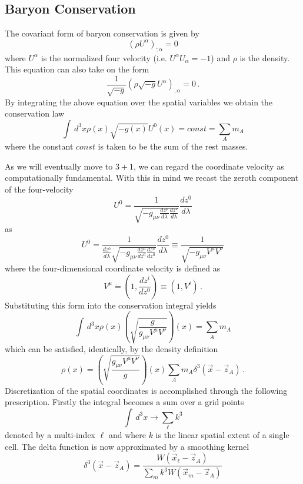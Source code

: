 \subsection{Baryon Conservation}

The covariant form of baryon conservation is given by 
\[
  \left( \rho U^{\alpha} \right)_{;\alpha} = 0
\]
where $U^{\alpha}$ is the normalized four velocity 
(i.e. $U^{\alpha} U_{\alpha} = -1$) and $\rho$ is the 
density.
This equation can also take on the form
\[
  \frac{1}{\sqrt{-g}} \left( \rho \sqrt{-g} U^{\alpha} \right)_{,\alpha} = 0 \, .
\]
By integrating the above equation over the spatial variables we
obtain the conservation law
\[
  \int \, d^3 x \rho(x) \sqrt{-g(x)} {U^{0}}(x) = const = \sum _A m_A
\]
where the constant $const$ is taken to be the sum of the rest masses.

As we will eventually move to $3+1$, we can regard  
the coordinate velocity as computationally fundamental.  
With this in mind we recast the zeroth component of the four-velocity
\[
  U^0 = \frac{1}{\sqrt{ -g_{\mu \nu} 
                        \frac{d z^{\mu}}{d \lambda}
                        \frac{d z^{\nu}}{d \lambda}				  
    	              } }
		\frac{d z^0}{d \lambda}
\]
as
\[
  U^0 = \frac{1}{ \frac{d z^0}{d \lambda} \sqrt{ -g_{\mu \nu} 
                        \frac{d z^{\mu}}{d z^0}
                        \frac{d z^{\nu}}{d z^0}				  
    	              } }
		\frac{d z^0}{d \lambda} 
	  \equiv \frac{1}{ \sqrt{ -g_{\mu \nu} V^{\mu} V^{\nu} } } 
\]
where the four-dimensional coordinate velocity is defined as
\[
  V^{\mu} {\dot = } \left(1, \frac{d z^i}{d z^0} \right) \equiv \left(1, V^i \right) \, .  
\]
Substituting this form into the conservation integral yields
\[
  \int \, d^3 x \rho(x)
                \left( 
                \sqrt{
                      \frac{ g } {g_{\mu \nu} V^{\mu} V^{\nu}}  
                     }
				\right)(x)  = \sum _A m_A
\]
which can be satisfied, identically, by the density definition
\[
  \rho(x) = \left(
            \sqrt{
                   \frac{g_{\mu \nu} V^{\mu} V^{\nu}}{g}
                 }
		    \right)(x)
            \sum _A m_A \delta^3(\vec x - \vec z_A) \, .
\]
Discretization of the spatial coordinates is accomplished through the  
following prescription.  
Firstly the integral becomes a sum over a grid points 
\[
  \int \, d^3 x \rightarrow \sum _{\ell} k^3 
\]
denoted by 
a multi-index $\ell$ and where $k$ is the linear spatial extent
of a single cell.
The delta function is now approximated by a smoothing kernel
\[
  \delta^3(\vec x - \vec z_A ) = \frac{W(\vec x_{\ell} - \vec z_A)}
                                       {\sum _m k^3 W(\vec x_m - \vec z_A)}
\]
